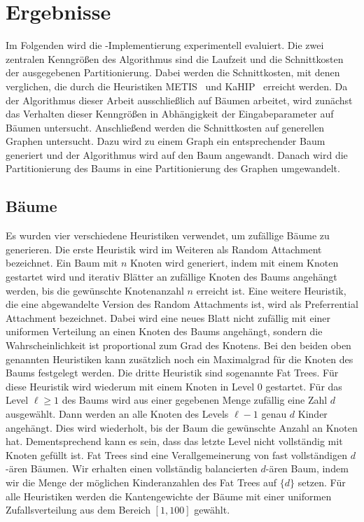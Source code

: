 
\chapter{Ergebnisse}\label{chapter:ergebnisse}
Im Folgenden wird die \Cpp\hyp Implementierung experimentell evaluiert.
Die zwei zentralen Kenngrößen des Algorithmus sind die Laufzeit und die Schnittkosten der ausgegebenen Partitionierung.
Dabei werden die Schnittkosten, mit denen verglichen, die durch die Heuristiken METIS~\cite{KK98} und KaHIP~\cite{SS13} erreicht werden.
Da der Algorithmus dieser Arbeit ausschließlich auf Bäumen arbeitet, wird zunächst das Verhalten dieser Kenngrößen in Abhängigkeit der Eingabeparameter auf Bäumen untersucht.
Anschließend werden die Schnittkosten auf generellen Graphen untersucht.
Dazu wird zu einem Graph ein entsprechender Baum generiert und der Algorithmus wird auf den Baum angewandt.
Danach wird die Partitionierung des Baums in eine Partitionierung des Graphen umgewandelt.

\section{Bäume}
Es wurden vier verschiedene Heuristiken verwendet, um zufällige Bäume zu generieren.
Die erste Heuristik wird im Weiteren als Random Attachment bezeichnet. 
Ein Baum mit $n$ Knoten wird generiert, indem mit einem Knoten gestartet wird und iterativ Blätter an zufällige Knoten des Baums angehängt werden, bis die gewünschte Knotenanzahl $n$ erreicht ist.
Eine weitere Heuristik, die eine abgewandelte Version des Random Attachments ist, wird als Preferrential Attachment bezeichnet.
Dabei wird eine neues Blatt nicht zufällig mit einer uniformen Verteilung an einen Knoten des Baums angehängt, sondern die Wahrscheinlichkeit ist proportional zum Grad des Knotens.
Bei den beiden oben genannten Heuristiken kann zusätzlich noch ein Maximalgrad für die Knoten des Baums festgelegt werden.
Die dritte Heuristik sind sogenannte Fat Trees.
Für diese Heuristik wird wiederum mit einem Knoten in Level $0$ gestartet.
Für das Level $\ell \geq 1$ des Baums wird aus einer gegebenen Menge zufällig eine Zahl $d$ ausgewählt.
Dann werden an alle Knoten des Levels $\ell - 1$ genau $d$ Kinder angehängt.
Dies wird wiederholt, bis der Baum die gewünschte Anzahl an Knoten hat. 
Dementsprechend kann es sein, dass das letzte Level nicht vollständig mit Knoten gefüllt ist.
Fat Trees sind eine Verallgemeinerung von fast vollständigen $d$\hyp ären Bäumen.
Wir erhalten einen vollständig balancierten $d$\hyp ären Baum, indem wir die Menge der möglichen Kinderanzahlen des Fat Trees auf $\{d\}$ setzen.
Für alle Heuristiken werden die Kantengewichte der Bäume mit einer uniformen Zufallsverteilung aus dem Bereich $[1, 100]$ gewählt.

